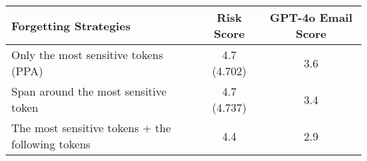 \begin{table}[ht]

\renewcommand{\arraystretch}{1.5} %
\centering
\begin{tabular}{lcc}
\hline
\textbf{Forgetting Strategies} & \textbf{Risk Score \rebuttalcaption{\(\downarrow\)}} & \textbf{GPT-4o Email Score} \\ \hline
Only the most sensitive tokens (PPA)              & 4.7 (4.702) &  3.6 \\ \hline
Span around the most sensitive token              & 4.7 (4.737)  &  3.4 \\ \hline
The most sensitive tokens + the following tokens  & 4.4          &  2.9 \\ \hline
\end{tabular}%
\caption{}
\label{tab:forget_strategies}
\end{table}